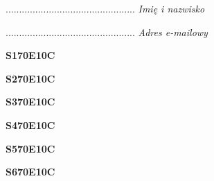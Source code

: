 \begin{turn}{90}\begin{minipage}{\linewidth} \vspace{20mm} ................................................  \textit{Imię i nazwisko}\end{minipage}\end{turn}

\begin{turn}{90}\begin{minipage}{\linewidth} \vspace{20mm} ................................................  \textit{Adres e-mailowy}\end{minipage}\end{turn}

\begin{turn}{90}\huge \begin{minipage}{\linewidth} \vspace{10mm}\textbf{S170E10C}\end{minipage}\end{turn}

\begin{turn}{90}\huge \begin{minipage}{\linewidth} \vspace{10mm}\textbf{S270E10C}\end{minipage}\end{turn}

\begin{turn}{90}\huge \begin{minipage}{\linewidth} \vspace{10mm}\textbf{S370E10C}\end{minipage}\end{turn}

\begin{turn}{90}\huge \begin{minipage}{\linewidth} \vspace{10mm}\textbf{S470E10C}\end{minipage}\end{turn}

\begin{turn}{90}\huge \begin{minipage}{\linewidth} \vspace{10mm}\textbf{S570E10C}\end{minipage}\end{turn}

\begin{turn}{90}\huge \begin{minipage}{\linewidth} \vspace{10mm}\textbf{S670E10C}\end{minipage}\end{turn}

